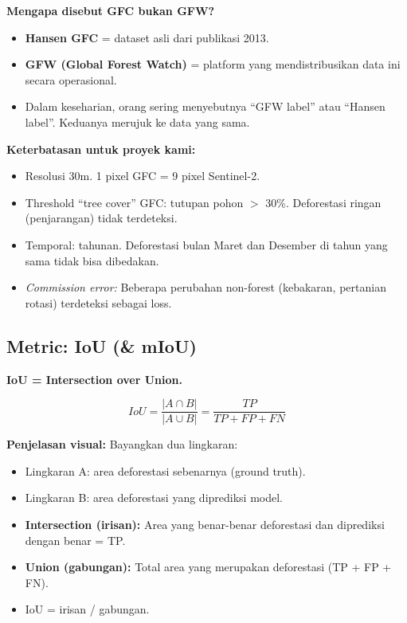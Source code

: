 \documentclass[10pt,a4paper,onecolumn]{article}
\begin{document}
\textbf{Mengapa disebut GFC bukan GFW?}
\begin{itemize}[nosep]
    \item \textbf{Hansen GFC} = dataset asli dari publikasi 2013.
    \item \textbf{GFW (Global Forest Watch)} = platform yang
          mendistribusikan data ini secara operasional.
    \item Dalam keseharian, orang sering menyebutnya ``GFW label''
          atau ``Hansen label''. Keduanya merujuk ke data yang sama.
\end{itemize}

\textbf{Keterbatasan untuk proyek kami:}
\begin{itemize}[nosep]
    \item Resolusi 30m. 1 pixel GFC = 9 pixel Sentinel-2.
    \item Threshold ``tree cover'' GFC: tutupan pohon $>$ 30\%.
          Deforestasi ringan (penjarangan) tidak terdeteksi.
    \item Temporal: tahunan. Deforestasi bulan Maret dan Desember
          di tahun yang sama tidak bisa dibedakan.
    \item \textit{Commission error:} Beberapa perubahan non-forest
          (kebakaran, pertanian rotasi) terdeteksi sebagai loss.
\end{itemize}

\subsection{Metric: IoU (\& mIoU)}

\textbf{IoU = Intersection over Union.}

$$IoU = \frac{|A \cap B|}{|A \cup B|} = \frac{TP}{TP + FP + FN}$$

\textbf{Penjelasan visual:} Bayangkan dua lingkaran:
\begin{itemize}[nosep]
    \item Lingkaran A: area deforestasi sebenarnya (ground truth).
    \item Lingkaran B: area deforestasi yang diprediksi model.
    \item \textbf{Intersection (irisan):} Area yang benar-benar
          deforestasi dan diprediksi dengan benar = TP.
    \item \textbf{Union (gabungan):} Total area yang merupakan
          deforestasi (TP + FP + FN).
    \item IoU = irisan / gabungan.
\end{itemize}
\end{document}
